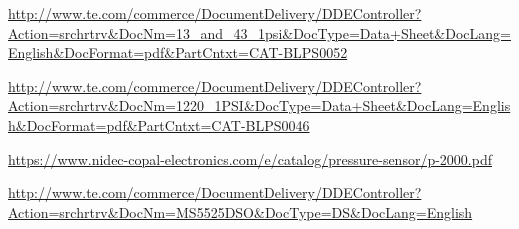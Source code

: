 \documentclass[11pt]{report}
\begin{document}
  \url{http://www.te.com/commerce/DocumentDelivery/DDEController?Action=srchrtrv&DocNm=13_and_43_1psi&DocType=Data+Sheet&DocLang=English&DocFormat=pdf&PartCntxt=CAT-BLPS0052}
  
  \url{http://www.te.com/commerce/DocumentDelivery/DDEController?Action=srchrtrv&DocNm=1220_1PSI&DocType=Data+Sheet&DocLang=English&DocFormat=pdf&PartCntxt=CAT-BLPS0046}
  
  \url{https://www.nidec-copal-electronics.com/e/catalog/pressure-sensor/p-2000.pdf}
  
  \url{http://www.te.com/commerce/DocumentDelivery/DDEController?Action=srchrtrv&DocNm=MS5525DSO&DocType=DS&DocLang=English}
  
\end{document}
